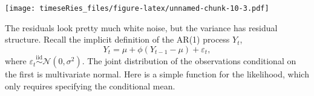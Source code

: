 \documentclass[]{book}
\newenvironment{Shaded}{\begin{snugshade}}{\end{snugshade}}
\newcommand{\KeywordTok}[1]{\textcolor[rgb]{0.13,0.29,0.53}{\textbf{#1}}}
\newcommand{\DataTypeTok}[1]{\textcolor[rgb]{0.13,0.29,0.53}{#1}}
\newcommand{\DecValTok}[1]{\textcolor[rgb]{0.00,0.00,0.81}{#1}}
\newcommand{\StringTok}[1]{\textcolor[rgb]{0.31,0.60,0.02}{#1}}
\newcommand{\CommentTok}[1]{\textcolor[rgb]{0.56,0.35,0.01}{\textit{#1}}}
\newcommand{\OperatorTok}[1]{\textcolor[rgb]{0.81,0.36,0.00}{\textbf{#1}}}
\newcommand{\NormalTok}[1]{#1}
\begin{document}
\begin{Shaded}
\end{Shaded}

\texttt{[image: timeseRies\_files/figure-latex/unnamed-chunk-10-3.pdf]}

The residuals look pretty much white noise, but the variance has
residual structure. Recall the implicit definition of the AR(1) process
\(Y_t\), \[Y_t=\mu+\phi(Y_{t-1}-\mu)+\varepsilon_t,\] where
\(\varepsilon_t \stackrel{\mathrm{iid}}{\sim} \mathcal{N}(0,\sigma^2)\).
The joint distribution of the observations conditional on the first is
multivariate normal. Here is a simple function for the likelihood, which
only requires specifying the conditional mean.
\end{document}
